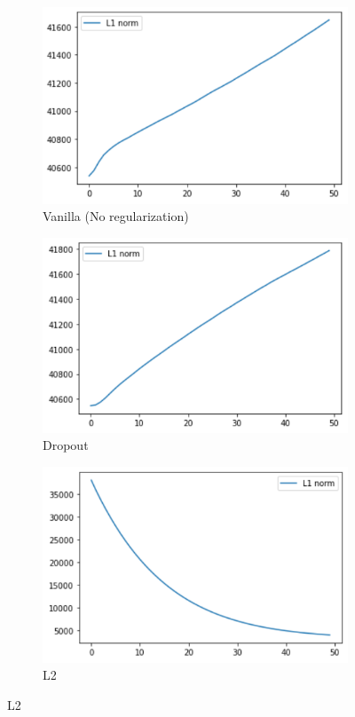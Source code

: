\documentclass[11pt]{article}
\begin{document}
    \begin{figure}[H]
        \begin{subfigure}[H]{0.5\textwidth}
            \includegraphics[width=1\linewidth]{img/MLP/l1.PNG}
            \caption{Vanilla (No regularization)}\vspace{2mm}
        \end{subfigure}
        \begin{subfigure}[H]{0.5\textwidth}
            \includegraphics[width=1\linewidth]{img/Dropout/l1.PNG}
            \caption{Dropout}\vspace{2mm}
        \end{subfigure}
        \begin{subfigure}[H]{0.5\textwidth}
            \includegraphics[width=1\linewidth]{img/L2/l1.PNG}\caption{L2}

\end{subfigure}
\end{figure}
\end{document}
